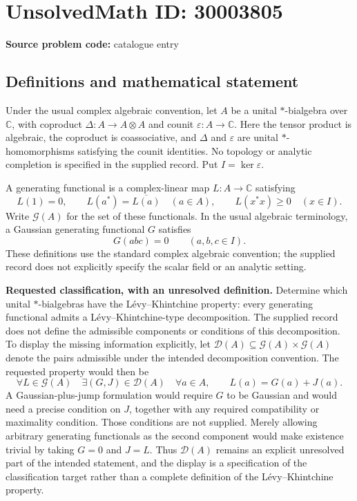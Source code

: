 \documentclass[11pt]{article}
\newcommand{\C}{\mathbb{C}}
\begin{document}
\section*{UnsolvedMath ID: 30003805}
\textbf{Source problem code:} catalogue entry
\subsection{Definitions and mathematical statement}
Under the usual complex algebraic convention, let \(A\) be a unital \(*\)-bialgebra over \(\C\), with coproduct \(\Delta:A\to A\otimes A\) and counit \(\varepsilon:A\to\C\). Here the tensor product is algebraic, the coproduct is coassociative, and \(\Delta\) and \(\varepsilon\) are unital \(*\)-homomorphisms satisfying the counit identities. No topology or analytic completion is specified in the supplied record. Put \(I=\ker\varepsilon\).

A generating functional is a complex-linear map \(L:A\to\C\) satisfying
\[
L(1)=0,\qquad L(a^*)=\overline{L(a)}\quad(a\in A),\qquad L(x^*x)\geq0\quad(x\in I).
\]
Write \(\mathcal G(A)\) for the set of these functionals. In the usual algebraic terminology, a Gaussian generating functional \(G\) satisfies
\[
G(abc)=0\qquad(a,b,c\in I).
\]
These definitions use the standard complex algebraic convention; the supplied record does not explicitly specify the scalar field or an analytic setting.

\textbf{Requested classification, with an unresolved definition.} Determine which unital \(*\)-bialgebras have the L\'evy--Khintchine property: every generating functional admits a L\'evy--Khintchine-type decomposition. The supplied record does not define the admissible components or conditions of this decomposition. To display the missing information explicitly, let \(\mathcal D(A)\subseteq\mathcal G(A)\times\mathcal G(A)\) denote the pairs admissible under the intended decomposition convention. The requested property would then be
\[
\forall L\in\mathcal G(A)\quad\exists (G,J)\in\mathcal D(A)\quad\forall a\in A,\qquad L(a)=G(a)+J(a).
\]
A Gaussian-plus-jump formulation would require \(G\) to be Gaussian and would need a precise condition on \(J\), together with any required compatibility or maximality condition. Those conditions are not supplied. Merely allowing arbitrary generating functionals as the second component would make existence trivial by taking \(G=0\) and \(J=L\). Thus \(\mathcal D(A)\) remains an explicit unresolved part of the intended statement, and the display is a specification of the classification target rather than a complete definition of the L\'evy--Khintchine property.
\end{document}
